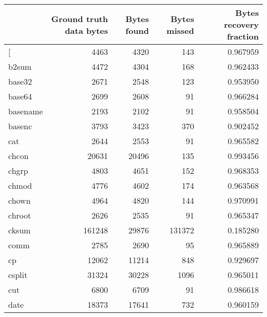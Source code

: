 \begin{tabular}{lrrrr}
\toprule
{} &  Ground truth data bytes &  Bytes found &  Bytes missed &  Bytes recovery fraction \\
\midrule
[         &                     4463 &         4320 &           143 &                 0.967959 \\
b2sum     &                     4472 &         4304 &           168 &                 0.962433 \\
base32    &                     2671 &         2548 &           123 &                 0.953950 \\
base64    &                     2699 &         2608 &            91 &                 0.966284 \\
basename  &                     2193 &         2102 &            91 &                 0.958504 \\
basenc    &                     3793 &         3423 &           370 &                 0.902452 \\
cat       &                     2644 &         2553 &            91 &                 0.965582 \\
chcon     &                    20631 &        20496 &           135 &                 0.993456 \\
chgrp     &                     4803 &         4651 &           152 &                 0.968353 \\
chmod     &                     4776 &         4602 &           174 &                 0.963568 \\
chown     &                     4964 &         4820 &           144 &                 0.970991 \\
chroot    &                     2626 &         2535 &            91 &                 0.965347 \\
cksum     &                   161248 &        29876 &        131372 &                 0.185280 \\
comm      &                     2785 &         2690 &            95 &                 0.965889 \\
cp        &                    12062 &        11214 &           848 &                 0.929697 \\
csplit    &                    31324 &        30228 &          1096 &                 0.965011 \\
cut       &                     6800 &         6709 &            91 &                 0.986618 \\
date      &                    18373 &        17641 &           732 &                 0.960159 \\

\end{tabular}
